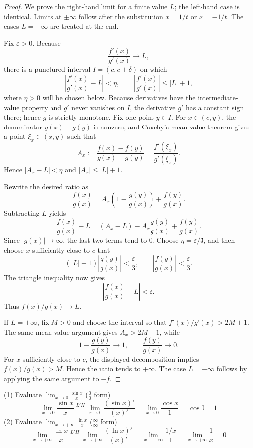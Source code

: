 \begin{proof}
We prove the right-hand limit for a finite value $L$; the left-hand case is identical. Limits at $\pm\infty$ follow after the substitution $x=1/t$ or $x=-1/t$. The cases $L=\pm\infty$ are treated at the end.

Fix $\varepsilon>0$. Because
\[
\frac{f'(x)}{g'(x)}\longrightarrow L,
\]
there is a punctured interval $I=(c,c+\delta)$ on which
\[
\left|\frac{f'(x)}{g'(x)}-L\right|<\eta,
\qquad
\left|\frac{f'(x)}{g'(x)}\right|\le |L|+1,
\]
where $\eta>0$ will be chosen below. Because derivatives have the intermediate-value property and $g'$ never vanishes on $I$, the derivative $g'$ has a constant sign there; hence $g$ is strictly monotone. Fix one point $y\in I$. For $x\in(c,y)$, the denominator $g(x)-g(y)$ is nonzero, and Cauchy's mean value theorem gives a point $\xi_x\in(x,y)$ such that
\[
A_x:=\frac{f(x)-f(y)}{g(x)-g(y)}
     =\frac{f'(\xi_x)}{g'(\xi_x)}.
\]
Hence $|A_x-L|<\eta$ and $|A_x|\le |L|+1$.

Rewrite the desired ratio as
\[
\frac{f(x)}{g(x)}
=A_x\left(1-\frac{g(y)}{g(x)}\right)
 +\frac{f(y)}{g(x)}.
\]
Subtracting $L$ yields
\[
\frac{f(x)}{g(x)}-L
=(A_x-L)-A_x\frac{g(y)}{g(x)}+\frac{f(y)}{g(x)}.
\]
Since $|g(x)|\to\infty$, the last two terms tend to $0$. Choose $\eta=\varepsilon/3$, and then choose $x$ sufficiently close to $c$ that
\[
(|L|+1)\left|\frac{g(y)}{g(x)}\right|<\frac{\varepsilon}{3},
\qquad
\left|\frac{f(y)}{g(x)}\right|<\frac{\varepsilon}{3}.
\]
The triangle inequality now gives
\[
\left|\frac{f(x)}{g(x)}-L\right|<\varepsilon.
\]
Thus $f(x)/g(x)\to L$.

If $L=+\infty$, fix $M>0$ and choose the interval so that $f'(x)/g'(x)>2M+1$. The same mean-value argument gives $A_x>2M+1$, while
\[
1-\frac{g(y)}{g(x)}\longrightarrow1,
\qquad
\frac{f(y)}{g(x)}\longrightarrow0.
\]
For $x$ sufficiently close to $c$, the displayed decomposition implies $f(x)/g(x)>M$. Hence the ratio tends to $+\infty$. The case $L=-\infty$ follows by applying the same argument to $-f$.
\end{proof}

\begin{example}
(1) Evaluate $\lim_{x \to 0} \frac{\sin x}{x}$ ($\frac{0}{0}$ form)
\[
\lim_{x \to 0} \frac{\sin x}{x} \overset{L'H}{=} \lim_{x \to 0} \frac{(\sin x)'}{(x)'} = \lim_{x \to 0} \frac{\cos x}{1} = \cos 0 = 1
\]
(2) Evaluate $\lim_{x \to +\infty} \frac{\ln x}{x}$ ($\frac{\infty}{\infty}$ form)
\[
\lim_{x \to +\infty} \frac{\ln x}{x} \overset{L'H}{=} \lim_{x \to +\infty} \frac{(\ln x)'}{(x)'} = \lim_{x \to +\infty} \frac{1/x}{1} = \lim_{x \to +\infty} \frac{1}{x} = 0
\]
\end{example}

